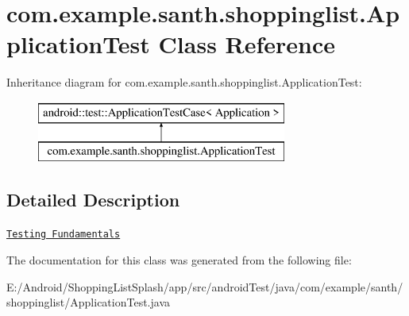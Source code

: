 \hypertarget{classcom_1_1example_1_1santh_1_1shoppinglist_1_1_application_test}{}\section{com.\+example.\+santh.\+shoppinglist.\+Application\+Test Class Reference}
\label{classcom_1_1example_1_1santh_1_1shoppinglist_1_1_application_test}
Inheritance diagram for com.\+example.\+santh.\+shoppinglist.\+Application\+Test\+:\begin{figure}[H]
\begin{center}
\leavevmode
\includegraphics[height=2.000000cm]{classcom_1_1example_1_1santh_1_1shoppinglist_1_1_application_test}
\end{center}
\end{figure}


\subsection{Detailed Description}
\href{http://d.android.com/tools/testing/testing_android.html}{\tt Testing Fundamentals} 

The documentation for this class was generated from the following file\+:\begin{DoxyCompactItemize}
\item 
E\+:/\+Android/\+Shopping\+List\+Splash/app/src/android\+Test/java/com/example/santh/shoppinglist/Application\+Test.\+java\end{DoxyCompactItemize}
